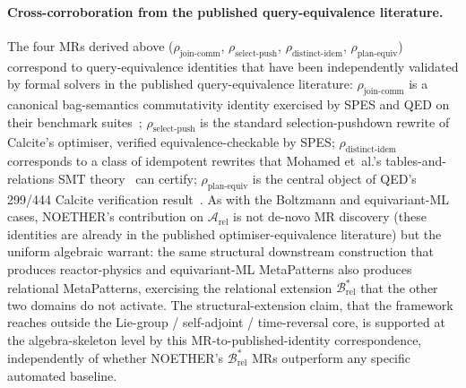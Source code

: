 \documentclass[acmsmall,screen,review]{acmart}
\begin{document}
\paragraph{Cross-corroboration from the published query-equivalence literature.}
The four MRs derived above ($\rho_{\mathrm{join\text{-}comm}}$, $\rho_{\mathrm{select\text{-}push}}$, $\rho_{\mathrm{distinct\text{-}idem}}$, $\rho_{\mathrm{plan\text{-}equiv}}$) correspond to query-equivalence identities that have been independently validated by formal solvers in the published query-equivalence literature: $\rho_{\mathrm{join\text{-}comm}}$ is a canonical bag-semantics commutativity identity exercised by SPES and QED on their benchmark suites~\cite{Wang2024QED, Zhou2022SPES}; $\rho_{\mathrm{select\text{-}push}}$ is the standard selection-pushdown rewrite of Calcite's optimiser, verified equivalence-checkable by SPES; $\rho_{\mathrm{distinct\text{-}idem}}$ corresponds to a class of idempotent rewrites that Mohamed et~al.'s tables-and-relations SMT theory~\cite{Mohamed2024SQLTables} can certify; $\rho_{\mathrm{plan\text{-}equiv}}$ is the central object of QED's 299/444 Calcite verification result~\cite{Wang2024QED}. As with the Boltzmann and equivariant-ML cases, NOETHER's contribution on $\mathcal{A}_{\mathrm{rel}}$ is not de-novo MR discovery (these identities are already in the published optimiser-equivalence literature) but the uniform algebraic warrant: the same structural downstream construction that produces reactor-physics and equivariant-ML MetaPatterns also produces relational MetaPatterns, exercising the relational extension $\mathcal{B}^{*}_{\mathrm{rel}}$ that the other two domains do not activate. The structural-extension claim, that the framework reaches outside the Lie-group / self-adjoint / time-reversal core, is supported at the algebra-skeleton level by this MR-to-published-identity correspondence, independently of whether NOETHER's $\mathcal{B}^{*}_{\mathrm{rel}}$ MRs outperform any specific automated baseline.
\end{document}
